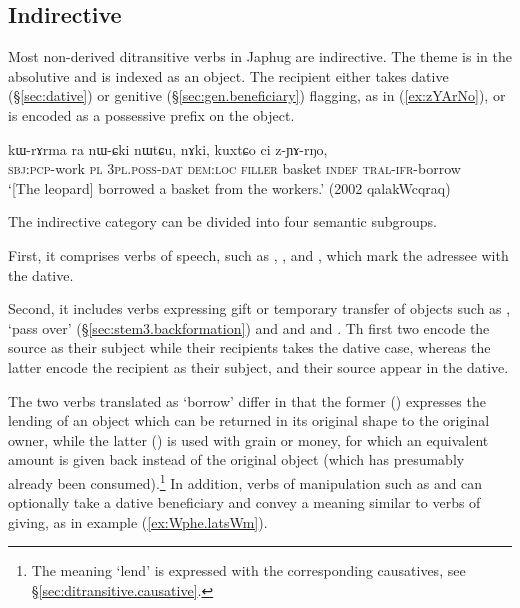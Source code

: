 \subsection{Indirective} \label{sec:ditransitive.indirective}
  
Most non-derived ditransitive verbs in Japhug are indirective. The theme is in the absolutive and is indexed as an object. The recipient either takes dative (§\ref{sec:dative}) or genitive (§\ref{sec:gen.beneficiary}) flagging, as in (\ref{ex:zYArNo}), or is encoded as a possessive prefix on the object.

\begin{exe}
	\ex \label{ex:zYArNo}
	\gll kɯ-rɤrma ra nɯ-ɕki nɯtɕu, nɤki, kuxtɕo ci z-ɲɤ-rŋo, \\
	\textsc{sbj}:\textsc{pcp}-work \textsc{pl} \textsc{3pl}.\textsc{poss}-\textsc{dat} \textsc{dem}:\textsc{loc} \textsc{filler} basket \textsc{indef} \textsc{tral}-\textsc{ifr}-borrow \\
	\glt  `[The leopard] borrowed a basket from the workers.' (2002 qalakWcqraq)
\end{exe}

The indirective category can be divided into four semantic subgroups. 

First, it comprises verbs of speech, such as , ,   and , which mark the adressee with the dative.

Second, it includes verbs expressing gift or temporary transfer of objects such as , `pass over' (§\ref{sec:stem3.backformation}) and  and   and . Th first two encode the source as their subject while their recipients takes the dative case, whereas the latter encode the recipient as their subject, and their source appear in the dative. 

The two verbs translated as `borrow' differ in that the former () expresses the lending of an object which can be returned in its original shape to the original owner, while the latter () is used with grain or money, for which an equivalent amount is given back instead of the original object (which has presumably already been consumed).\footnote{The meaning `lend' is expressed with the corresponding causatives, see §\ref{sec:ditransitive.causative}.} In addition, verbs of manipulation such as  and  can optionally take a dative beneficiary and convey a meaning similar to verbs of giving, as in example (\ref{ex:Wphe.latsWm}).



